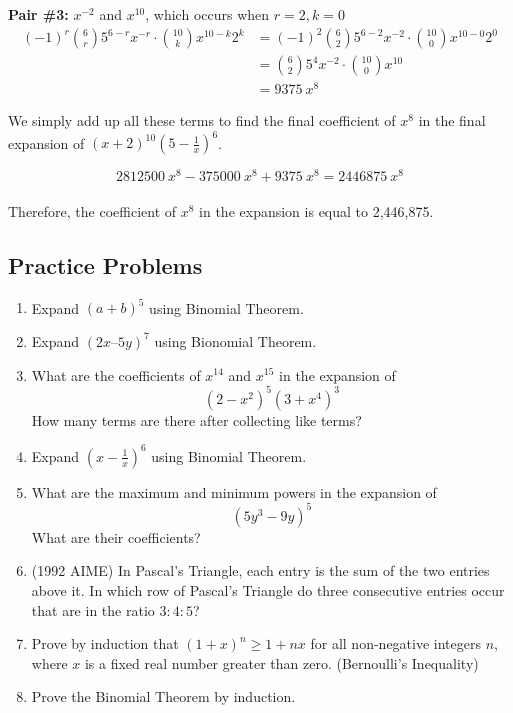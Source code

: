 \documentclass{article}
\begin{document}
\textbf{Pair \#3:} $x^{-2}$ and $x^{10}$, which occurs when $r = 2,k = 0$ \\

\begin{align*}
    (-1)^r{6\choose r}5^{6-r}x^{-r} \cdot {10\choose k}x^{10-k}2^k & =(-1)^2{6\choose 2}5^{6-2}x^{-2}\cdot {10\choose 0}x^{10-0}2^0 \\
    & = {6\choose 2}5^4x^{-2}\cdot{10\choose 0}x^{10} \\
    & = 9375\:x^8
\end{align*}

We simply add up all these terms to find the final coefficient of $x^8$ in the final expansion of $(x+2)^{10}(5-\frac{1}{x})^6$.

$$2812500\:x^8 - 375000\:x^8 + 9375\:x^8 = 2446875\:x^8$$ \\
Therefore, the coefficient of $x^8$ in the expansion is equal to 2,446,875.

\bigskip

\subsection{Practice Problems}

\begin{enumerate}
    \item Expand $(a+b)^5$ using Binomial Theorem.
    \item Expand $(2x – 5y)^7$ using Bionomial Theorem.
    \item What are the coefficients of $x^{14}$ and $x^{15}$ in the expansion of $$(2-x^2)^5(3+x^4)^3$$
    How many terms are there after collecting like terms?
    \item Expand $(x-\frac{1}{x})^6$ using Binomial Theorem.
    \item What are the maximum and minimum powers in the expansion of $$(5y^3 - 9y)^5$$
    What are their coefficients?
    \item (1992 AIME) In Pascal's Triangle, each entry is the sum of the two entries above it. In which row of Pascal's Triangle do three consecutive entries occur that are in the ratio $3: 4: 5$?
    \item Prove by induction that $(1+x)^n \geq 1+nx$ for all non-negative integers $n$, where $x$ is a fixed real number greater than zero. (Bernoulli's Inequality)
    \item Prove the Binomial Theorem by induction.
\end{enumerate}
\end{document}
